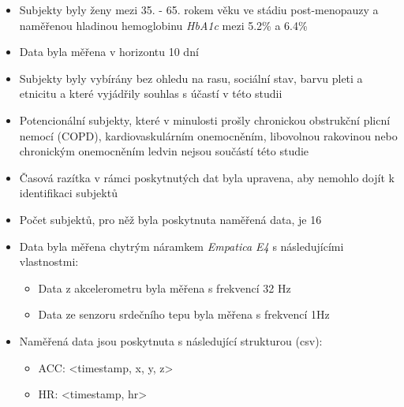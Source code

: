 \documentclass[12pt, a4paper]{article}
\begin{document}
\begin{itemize}
  \item Subjekty byly ženy mezi 35. - 65. rokem věku ve stádiu post-menopauzy a naměřenou hladinou hemoglobinu \textit{HbA1c} mezi 5.2\% a 6.4\% 
  \item Data byla měřena v horizontu 10 dní
  \item Subjekty byly vybírány bez ohledu na rasu, sociální stav, barvu pleti a etnicitu a které vyjádřily souhlas s účastí v této studii
  \item Potencionální subjekty, které v minulosti prošly chronickou obstrukční plicní nemocí (COPD), kardiovaskulárním onemocněním, libovolnou rakovinou nebo chronickým onemocněním ledvin nejsou součástí této studie 
  \item Časová razítka v rámci poskytnutých dat byla upravena, aby nemohlo dojít k identifikaci subjektů
  \item Počet subjektů, pro něž byla poskytnuta naměřená data, je 16
  \item Data byla měřena chytrým náramkem \textit{Empatica E4} s následujícími vlastnostmi:
    \begin{itemize}
      \item Data z akcelerometru byla měřena s frekvencí 32 Hz
      \item Data ze senzoru srdečního tepu byla měřena s frekvencí 1Hz 
    \end{itemize}
  \item Naměřená data jsou poskytnuta s následující strukturou (csv):
    \begin{itemize}
      \item ACC: <timestamp, x, y, z>
      \item HR: <timestamp, hr>
    \end{itemize}
\end{itemize}
\end{document}
